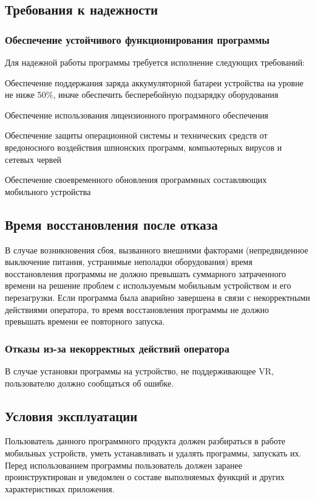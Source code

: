 \subsection{Требования к надежности}
\subsubsection{Обеспечение устойчивого функционирования программы}
Для надежной работы программы требуется исполнение следующих требований:
\begin{my_enumerate}
\item Обеспечение поддержания заряда аккумуляторной батареи устройства на уровне не ниже 50\%, иначе обеспечить бесперебойную подзарядку оборудования
\item Обеспечение использования лицензионного программного обеспечения
\item Обеспечение защиты операционной системы и технических средств от вредоносного воздействия шпионских программ, компьютерных вирусов и сетевых червей
\item Обеспечение своевременного обновления программных составляющих мобильного устройства
\end{my_enumerate}


\subsection{Время восстановления после отказа}
В случае возникновения сбоя, вызванного внешними факторами (непредвиденное выключение питания, устранимые неполадки оборудования) время восстановления программы не должно превышать суммарного затраченного времени на решение проблем с используемым мобильным устройством и его перезагрузки. Если программа была аварийно завершена в связи с некорректными действиями оператора, то время восстановления программы не должно превышать времени ее повторного запуска.

\subsubsection{Отказы из-за некорректных действий оператора}
В случае установки программы на устройство, не поддерживающее VR, пользователю должно сообщаться об ошибке.


\subsection{Условия эксплуатации}
Пользователь данного программного продукта должен разбираться в работе мобильных устройств, уметь устанавливать и удалять программы, запускать их. Перед использованием программы пользователь должен заранее проинструктирован и уведомлен о составе выполняемых функций и других характеристиках приложения.


